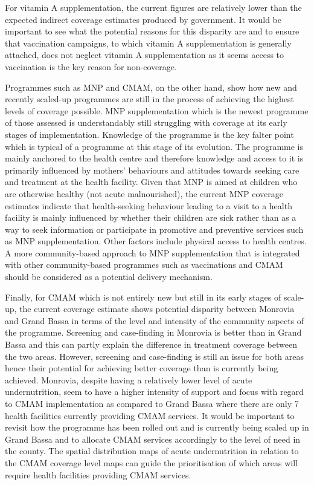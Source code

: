 \documentclass[12pt,a4paper]{article}
\theoremstyle{definition}
\theoremstyle{definition}
\theoremstyle{definition}
\theoremstyle{remark}
\begin{document}
For vitamin A supplementation, the current figures are relatively lower
than the expected indirect coverage estimates produced by government. It
would be important to see what the potential reasons for this disparity
are and to ensure that vaccination campaigns, to which vitamin A
supplementation is generally attached, does not neglect vitamin A
supplementation as it seems access to vaccination is the key reason for
non-coverage.

Programmes such as MNP and CMAM, on the other hand, show how new and
recently scaled-up programmes are still in the process of achieving the
highest levels of coverage possible. MNP supplementation which is the
newest programme of those assessed is understandably still struggling
with coverage at its early stages of implementation. Knowledge of the
programme is the key falter point which is typical of a programme at
this stage of its evolution. The programme is mainly anchored to the
health centre and therefore knowledge and access to it is primarily
influenced by mothers' behaviours and attitudes towards seeking care and
treatment at the health facility. Given that MNP is aimed at children
who are otherwise healthy (not acute malnourished), the current MNP
coverage estimates indicate that health-seeking behaviour leading to a
visit to a health facility is mainly influenced by whether their
children are sick rather than as a way to seek information or
participate in promotive and preventive services such as MNP
supplementation. Other factors include physical access to health
centres. A more community-based approach to MNP supplementation that is
integrated with other community-based programmes such as vaccinations
and CMAM should be considered as a potential delivery mechanism.

Finally, for CMAM which is not entirely new but still in its early
stages of scale-up, the current coverage estimate shows potential
disparity between Monrovia and Grand Bassa in terms of the level and
intensity of the community aspects of the programme. Screening and
case-finding in Monrovia is better than in Grand Bassa and this can
partly explain the difference in treatment coverage between the two
areas. However, screening and case-finding is still an issue for both
areas hence their potential for achieving better coverage than is
currently being achieved. Monrovia, despite having a relatively lower
level of acute undernutrition, seem to have a higher intensity of
support and focus with regard to CMAM implementation as compared to
Grand Bassa where there are only 7 health facilities currently providing
CMAM services. It would be important to revisit how the programme has
been rolled out and is currently being scaled up in Grand Bassa and to
allocate CMAM services accordingly to the level of need in the county.
The spatial distribution maps of acute undernutrition in relation to the
CMAM coverage level maps can guide the prioritisation of which areas
will require health facilities providing CMAM services.
\end{document}
